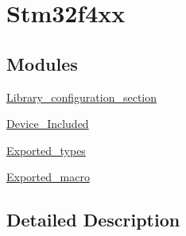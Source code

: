 \hypertarget{group__stm32f4xx}{}\section{Stm32f4xx}
\label{group__stm32f4xx}
\subsection*{Modules}
\begin{DoxyCompactItemize}
\item 
\hyperlink{group___library__configuration__section}{Library\+\_\+configuration\+\_\+section}
\item 
\hyperlink{group___device___included}{Device\+\_\+\+Included}
\item 
\hyperlink{group___exported__types}{Exported\+\_\+types}
\item 
\hyperlink{group___exported__macro}{Exported\+\_\+macro}
\end{DoxyCompactItemize}


\subsection{Detailed Description}
